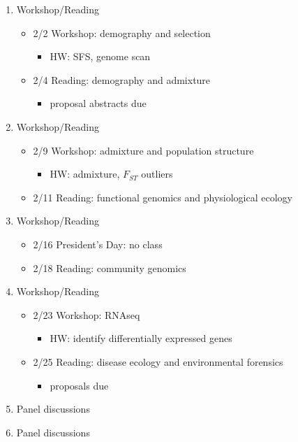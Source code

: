 \documentclass[]{article}
\begin{document}
\begin{enumerate}
\item Workshop/Reading
	\begin{itemize}
	\item 2/2 Workshop: demography and selection
		\begin{itemize}
		\item HW: SFS, genome scan		
		\end{itemize}
	\item 2/4 Reading: demography and admixture
		\begin{itemize}
		\item proposal abstracts due		
		\end{itemize}
\end{itemize}

\item Workshop/Reading
	\begin{itemize}
	\item 2/9 Workshop: admixture and population structure
		\begin{itemize}
		\item HW: admixture, $F_{ST}$ outliers 	\end{itemize}
	\item 2/11 Reading: functional genomics and physiological ecology
\end{itemize}

\item Workshop/Reading
	\begin{itemize}
	\item 2/16 President's Day: no class
	\item 2/18 Reading: community genomics
\end{itemize}

\item Workshop/Reading
	\begin{itemize}
	\item 2/23 Workshop: RNAseq
		\begin{itemize}
		\item HW: identify differentially expressed genes
		\end{itemize}
	\item 2/25 Reading: disease ecology and environmental forensics
		\begin{itemize}
		\item proposals due
		\end{itemize}
\end{itemize}

\item Panel discussions

\item Panel discussions

\end{enumerate}
\end{document}
